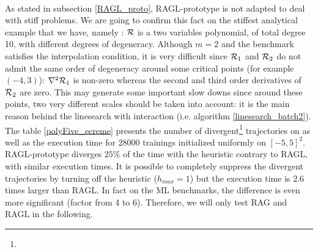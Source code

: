 ~~\\
As stated in subsection \ref{RAGL_proto}, RAGL-prototype is not adapted to deal with stiff
problems. We are going to confirm this fact on the stiffest analytical example that we have, namely \polyFive: $\mathcal{R}$ is a two variables polynomial, of total degree 10, with
different degrees of degeneracy. Although $m=2$ and the benchmark satisfies the interpolation condition, it is very difficult since $\mathcal{R}_1$ and $\mathcal{R}_2$ do not admit the same order of
degeneracy around some critical points (for example $(-4,3)$): $\nabla^2 \mathcal{R}_1$ is non-zero whereas the second and third order derivatives of $\mathcal{R}_2$ are zero. This may generate some
important slow downs since around these points, two very different scales should be taken into account: it is the main reason behind the linesearch with interaction (i.e.
algorithm \ref{linesearch_batch2}). \\
The table \ref{polyFive_ecreme} presents the number of divergent\footnote{} trajectories on \polyFive as well as the execution time for $28000$ trainings initialized uniformly on $[-5,5]^2$.
RAGL-prototype diverges $25 \%$ of the time with the heuristic contrary to RAGL, with similar execution times. It is possible to completely suppress the divergent trajectories by turning off the heuristic ($h_{max}=1$) but the execution time is $2.6$ times larger than RAGL. In fact on the ML benchmarks, the difference is even more significant (factor from 4 to 6). Therefore, we will only test RAG and RAGL in the following.


